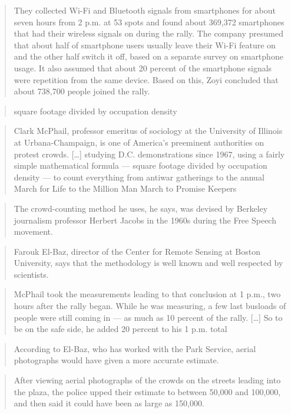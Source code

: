 \blockcquote{2016DemonstrationsInSeoul}{%
  They collected Wi-Fi and Bluetooth signals from smartphones for about seven 
  hours from 2 p.m. at 53 spots and found about 369,372 smartphones that had 
  their wireless signals on during the rally. The company presumed that about 
  half of smartphone users usually leave their Wi-Fi feature on and the other 
  half switch it off, based on a separate survey on smartphone usage. It also 
  assumed that about 20 percent of the smartphone signals were repetition from 
  the same device. Based on this, Zoyi concluded that about 738,700 people 
  joined the rally.%
}

\blockcquote{TheCrowdNumbersGame}{%
  square footage divided by occupation density%
}

\blockcquote{TheCrowdNumbersGame}{%
  Clark McPhail, professor emeritus of sociology at the University of Illinois at 
  Urbana-Champaign, is one of America’s preeminent authorities on protest crowds.
  [\dots]
  studying D.C. demonstrations since 1967, using a fairly simple mathematical 
  formula --- square footage divided by occupation density --- to count 
  everything from antiwar gatherings to the annual March for Life to the 
  Million Man March to Promise Keepers%
}

\blockcquote{TheCrowdNumbersGame}{%
  The crowd-counting method he uses, he says, was devised by Berkeley 
  journalism professor Herbert Jacobs in the 1960s during the Free Speech 
  movement.%
}

\blockcquote{TheCrowdNumbersGame}{%
  Farouk El-Baz, director of the Center for Remote Sensing at Boston 
  University, says that the methodology is well known and well respected by 
  scientists.%
}

\blockcquote{TheCrowdNumbersGame}{%
  McPhail took the measurements leading to that conclusion at 1 p.m., two hours 
  after the rally began. While he was measuring, a few last busloads of people 
  were still coming in --- as much as 10 percent of the rally.
  [\dots]
  So to be on the safe side, he added 20 percent to his 1 p.m. total%
}

\blockcquote{TheCrowdNumbersGame}{%
  According to El-Baz, who has worked with the Park Service, aerial photographs 
  would have given a more accurate estimate.%
}

\blockcquote{TheCrowdNumbersGame}{%
  After viewing aerial photographs of the crowds on the streets leading into the 
  plaza, the police upped their estimate to between 50,000 and 100,000, and 
  then said it could have been as large as 150,000.%
}

